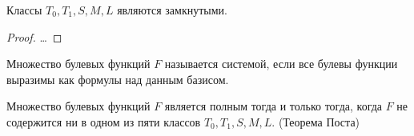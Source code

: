 \documentclass[a4paper, 14pt]{article}
\begin{document}
    \begin{theorem}
        Классы $T_0, T_1, S, M, L$ являются замкнутыми.
    \end{theorem}
    \begin{proof}
        \dots
    \end{proof}

    \begin{definition}
        Множество булевых функций $F$ называется { системой},
        если все булевы функции выразимы как формулы над данным базисом.
    \end{definition}

    \begin{theorem}
        Множество булевых функций $F$ является полным тогда и только
        тогда, когда $F$ не содержится ни в одном из пяти классов
        $T_0, T_1, S, M, L$. (Теорема Поста)
    \end{theorem}
\end{document}
